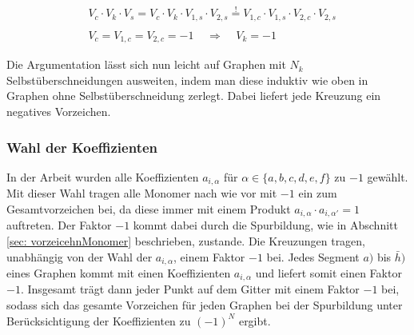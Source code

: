 \begin{equation}
\begin{aligned}
&V_c \cdot V_k \cdot V_s = V_c \cdot V_k \cdot V_{1,s} \cdot V_{2,s}   \overset{!}{=} V_{1,c} \cdot V_{1,s}  \cdot V_{2,c} \cdot V_{2,s} \\
\\
& V_{c} =  V_{1,c} = V_{2,c} = -1  \;\;\;\;\Rightarrow\;\;\;\;   V_k = -1
\end{aligned}
\end{equation}

\noindent Die Argumentation lässt sich nun leicht auf Graphen mit $N_k$ Selbstüberschneidungen ausweiten, indem man diese induktiv wie oben in Graphen ohne Selbstüberschneidung zerlegt. Dabei liefert jede Kreuzung ein negatives Vorzeichen. 

\subsubsection{Wahl der Koeffizienten}
In der Arbeit wurden alle Koeffizienten $a_{i,\alpha}$ für $\alpha \in \{a,b,c,d,e,f\}$ zu $-1$ gewählt. Mit dieser Wahl tragen alle Monomer nach wie vor mit $-1$ ein zum Gesamtvorzeichen bei, da diese immer mit einem Produkt ${a_{i,\alpha} \cdot a_{i,\alpha'} = 1}$ auftreten. Der Faktor $-1$ kommt dabei durch die Spurbildung, wie in Abschnitt \ref{sec: vorzeicehnMonomer} beschrieben, zustande. Die Kreuzungen tragen, unabhängig von der Wahl der $a_{i,\alpha}$, einem Faktor $-1$ bei. Jedes Segment $a)$ bis $\bar{h})$ eines Graphen kommt mit einen Koeffizienten $a_{i,\alpha}$ und liefert somit einen Faktor $-1$. Insgesamt trägt dann jeder Punkt auf dem Gitter mit einem Faktor $-1$ bei, sodass sich das gesamte Vorzeichen für jeden Graphen bei der Spurbildung unter Berücksichtigung der Koeffizienten zu $(-1)^N$ ergibt.
